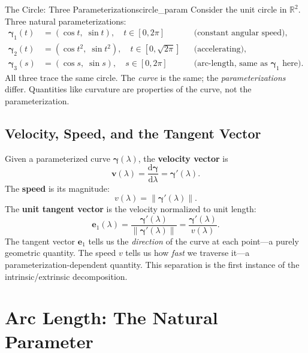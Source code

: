 \documentclass[12pt, openany]{book}
\theoremstyle{plain}
\newcommand{\traj}{\bm{\gamma}}
\newcommand{\Reals}{\mathbb{R}}
\newcommand{\dd}{\mathrm{d}}
\newcommand{\norm}[1]{\left\lVert #1 \right\rVert}
\newcommand{\tangent}{\bm{e}_1}
\begin{document}
\begin{example}{The Circle: Three Parameterizations}{circle_param}
  Consider the unit circle in $\Reals^2$. Three natural parameterizations:
  \begin{align}
    \traj_1(t) &= (\cos t,\; \sin t), \quad t \in [0, 2\pi]
    && \text{(constant angular speed)}, \\
    \traj_2(t) &= (\cos t^2,\; \sin t^2), \quad t \in [0, \sqrt{2\pi}]
    && \text{(accelerating)}, \\
    \traj_3(s) &= (\cos s,\; \sin s), \quad s \in [0, 2\pi]
    && \text{(arc-length, same as $\traj_1$ here)}.
  \end{align}
  All three trace the same circle. The \emph{curve} is the same; the
  \emph{parameterizations} differ. Quantities like curvature are properties of
  the curve, not the parameterization.
\end{example}

\subsection{Velocity, Speed, and the Tangent Vector}

Given a parameterized curve $\traj(\lambda)$, the \textbf{velocity vector} is
\begin{equation}
  \bm{v}(\lambda) = \frac{\dd\traj}{\dd\lambda} = \traj'(\lambda).
\end{equation}
The \textbf{speed} is its magnitude:
\begin{equation}
  v(\lambda) = \norm{\traj'(\lambda)}.
\end{equation}
The \textbf{unit tangent vector} is the velocity normalized to unit length:
\begin{equation}\label{eq:unit_tangent}
  \tangent(\lambda) = \frac{\traj'(\lambda)}{\norm{\traj'(\lambda)}}
  = \frac{\traj'(\lambda)}{v(\lambda)}.
\end{equation}
The tangent vector $\tangent$ tells us the \emph{direction} of the curve at each
point---a purely geometric quantity. The speed $v$ tells us how \emph{fast} we
traverse it---a parameterization-dependent quantity. This separation is the first
instance of the intrinsic/extrinsic decomposition.

\section{Arc Length: The Natural Parameter}
\end{document}
